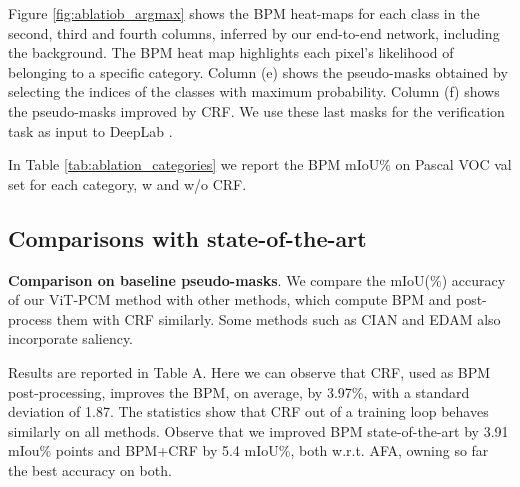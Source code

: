 \documentclass[runningheads]{styles/llncs}
\begin{document}
\noindent
Figure \ref{fig:ablatiob_argmax} shows the BPM heat-maps for each class in the second, third and fourth columns, inferred by our end-to-end network, including the background. The BPM heat map highlights each pixel's likelihood of belonging to a specific category. Column (e) shows the pseudo-masks obtained by selecting the indices of the classes with maximum probability. Column (f) shows the pseudo-masks improved by CRF. We use these last masks for the verification task as input to DeepLab \cite{Chen2018DeepLabSI}.
 
\noindent
In Table \ref{tab:ablation_categories} we report the BPM mIoU\%  on Pascal VOC val set for each category,  w and w/o CRF. 
\subsection{Comparisons with state-of-the-art}
{\bf Comparison on baseline pseudo-masks}. We compare the mIoU(\%) accuracy of our ViT-PCM method with other methods, which compute BPM and post-process them with CRF \cite{krahenbuhl2011efficient}  similarly. Some methods such as CIAN \cite{Fan2020CIANCA} and EDAM \cite{wu2021embedded}  also incorporate saliency.

Results are reported in Table {\color{red} A}. Here we can observe that CRF, used as BPM post-processing,  improves the BPM, on average, by 3.97\%, with a standard deviation of 1.87. The statistics show that CRF out of a training loop behaves similarly on all methods. Observe that we improved BPM  state-of-the-art by 3.91 mIou\% points and BPM+CRF by 5.4 mIoU\%, both w.r.t. AFA\cite{ru2022learning}, owning so far the best accuracy on both. 
\end{document}
